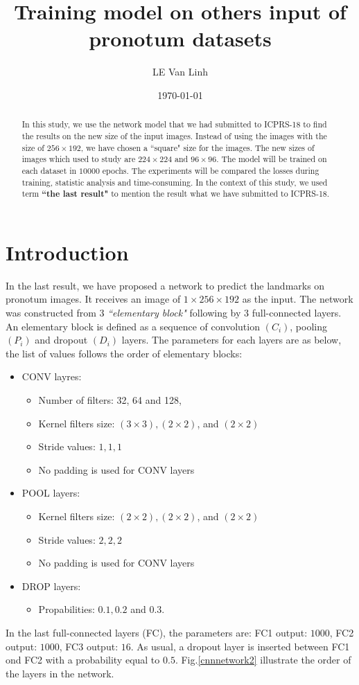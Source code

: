 \documentclass[12pt,a4paper]{article}
\begin{document}
\title{Training model on others input of pronotum datasets}
\author{LE Van Linh}
\date{\today}
\maketitle
\begin{abstract}
	In this study, we use the network model that we had submitted to ICPRS-18 to find the results on the new size of the input images. Instead of using the images with the size of $256 \times 192$, we have chosen a ``square" size for the images. The new sizes of images which used to study are $224 \times 224$ and $96 \times 96$. The model will be trained on each dataset in $10000$ epochs. The experiments will be compared the losses during training, statistic analysis and time-consuming. In the context of this study, we used term \textbf{``the last result"} to mention the result what we have submitted to ICPRS-18.
\end{abstract}
\section{Introduction}
In the last result, we have proposed a network to predict the landmarks on pronotum images. It receives an image of $1 \times 256 \times 192$ as the input. The network was constructed from $3$ \textit{``elementary block"} following by $3$ full-connected layers. An elementary block is defined as a sequence of convolution $(C_i)$, pooling $(P_i)$ and dropout $(D_i)$ layers. The parameters for each layers are as below, the list of values follows the order of elementary blocks:
\begin{itemize}[nosep,label=\footnotesize$\bullet$]
	\item CONV layres:
	\begin{itemize}[nosep]
		\item Number of filters: 32, 64 and 128,
		\item Kernel filters size: $(3 \times 3), (2 \times 2)$, and $(2 \times 2)$
		\item Stride values: $1,1,1$
		\item No padding is used for CONV layers
	\end{itemize}
	\item POOL layers:
	\begin{itemize}[nosep]
		\item Kernel filters size: $(2 \times 2), (2 \times 2)$, and $(2 \times 2)$
		\item Stride values: $2,2,2$
		\item No padding is used for CONV layers
	\end{itemize}
	\item DROP layers:
	\begin{itemize}
		\item Propabilities: $0.1, 0.2$ and $0.3$.
	\end{itemize}
\end{itemize}
In the last full-connected layers (FC), the parameters are: FC1
output: $1000$, FC2 output: $1000$, FC3 output: $16$. As usual, a
dropout layer is inserted between FC1 ond FC2 with a probability equal to $0.5$. Fig.\ref{cnnnetwork2} illustrate the order of the layers in the network.
\end{document}
